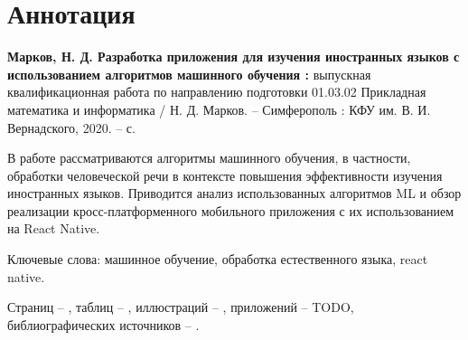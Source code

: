 \section*{Аннотация}
\textbf{Марков, Н. Д. Разработка приложения для изучения иностранных языков с использованием алгоритмов машинного обучения :} выпускная квалификационная работа по направлению подготовки 01.03.02 Прикладная математика и информатика / Н. Д. Марков. -- Симферополь : КФУ им. В. И. Вернадского, 2020. -- \pageref{LastPage}с.

В работе рассматриваются алгоритмы машинного обучения, в частности, обработки человеческой речи в контексте повышения эффективности изучения иностранных языков. Приводится анализ использованных алгоритмов ML и обзор реализации кросс-платформенного мобильного приложения с их использованием на React Native.

Ключевые слова: машинное обучение, обработка естественного языка, react native.

Страниц -- \pageref{LastPage}, таблиц -- \totaltables{}, иллюстраций -- \totalfigures{}, приложений -- {\color{red}TODO}, библиографических источников -- .
